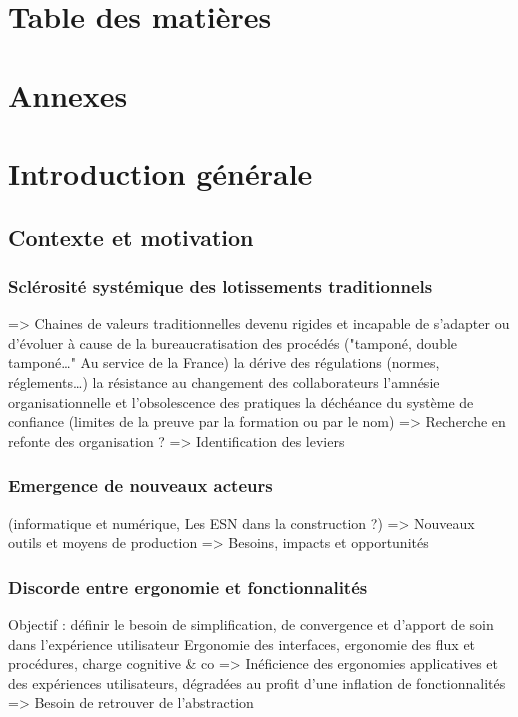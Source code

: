 \documentclass[a4paper,12pt]{article}
\begin{document}
\section*{Table des matières}
\label{sec:orgfb52257}
\renewcommand{\contentsname}{\vspace{-2em}}
\setcounter{tocdepth}{3}
\tableofcontents
\section*{Annexes}
\label{sec:org695dd87}
\listofappendices
\clearpage

\setcounter{section}{-1}
\section{Introduction générale}
\label{sec:org3c63f3e}
\subsection{Contexte et motivation}
\label{sec:orgc2c2499}
\subsubsection{Sclérosité systémique des lotissements traditionnels}
\label{sec:orgd5c0208}
=> Chaines de valeurs traditionnelles devenu rigides et incapable de s'adapter ou d'évoluer à cause de
      la bureaucratisation des procédés ("tamponé, double tamponé\ldots{}" Au service de la France)
      la dérive des régulations (normes, réglements\ldots{})   
      la résistance au changement des collaborateurs
      l'amnésie organisationnelle et l'obsolescence des pratiques
      la déchéance du système de confiance (limites de la preuve par la formation ou par le nom)
=> Recherche en refonte des organisation ?
=> Identification des leviers
\subsubsection{Emergence de nouveaux acteurs}
\label{sec:orgf905baa}
(informatique et numérique, Les ESN dans la construction ?)
=> Nouveaux outils et moyens de production
=> Besoins, impacts et opportunités
\subsubsection{Discorde entre ergonomie et fonctionnalités}
\label{sec:org3b2c8ac}
Objectif : définir le besoin de simplification, de convergence et d'apport de soin dans l'expérience utilisateur
Ergonomie des interfaces, ergonomie des flux et procédures, charge cognitive \& co
=> Inéficience des ergonomies applicatives et des expériences utilisateurs, dégradées au profit d'une inflation de fonctionnalités
=> Besoin de retrouver de l'abstraction
\end{document}
